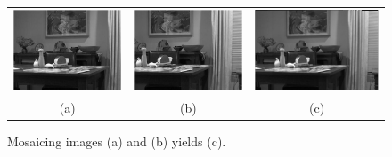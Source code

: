 \documentclass[11pt]{article} %
\begin{document}
\begin{figure}[H]
	\centering
	\begin{tabular}{ccc}
		\includegraphics[scale=.4]{LR1bw} &
		\includegraphics[scale=.4]{LR2bw} & 
		\includegraphics[scale=.4]{figures/mosaic1} \\
		(a) & (b) & (c)		
	\end{tabular}	
	\caption{Mosaicing images (a) and (b) yields (c).}
	\label{fig:mosaic}
\end{figure}
\end{document}
